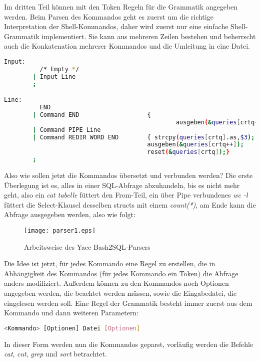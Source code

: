 Im dritten Teil können mit den Token Regeln für die Grammatik angegeben werden. Beim Parsen des Kommandos geht es zuerst um die richtige Interpretation der Shell-Kommandos, daher wird zuerst nur eine einfache Shell-Grammatik implementiert. Sie kann aus mehreren Zeilen bestehen und beherrscht auch die Konkatenation mehrerer Kommandos und die Umleitung in eine Datei.

\begin{lstlisting}[language=Bash]
Input:
          /* Empty */
        | Input Line
        ;

Line:
          END
        | Command END                   {
                                                ausgeben(&queries[crtq++]); reset(&queries[crtq]);}
        | Command PIPE Line            
        | Command REDIR WORD END        { strcpy(queries[crtq].as,$3);
                                        ausgeben(&queries[crtq++]);
                                        reset(&queries[crtq]);}
        ;
\end{lstlisting}

Also wie sollen jetzt die Kommandos übersetzt und verbunden werden? Die erste Überlegung ist es, alles in einer SQL-Abfrage abzuhandeln, bis es nicht mehr geht,
also ein \textit{cat tabelle} füttert den From-Teil, ein über Pipe verbundenes \textit{wc -l} füttert die Select-Klausel desselben structs mit einem \textit{count(*)}, am Ende kann die Abfrage ausgegeben werden, also wie folgt:

\begin{figure}[h]
\centering
\texttt{[image: parser1.eps]}
\caption{Arbeitsweise des Yacc Bash2SQL-Parsers}
\label{fig:parser1}
\end{figure}

Die Idee ist jetzt, für jedes Kommando eine Regel zu erstellen, die in Abhängigkeit des Kommandos (für jedes Kommando ein Token) die Abfrage anders modifiziert.
Außerdem können zu den Kommandos noch Optionen angegeben werden, die beachtet werden müssen, sowie die Eingabedatei, die eingelesen werden soll. Eine Regel der Grammatik besteht immer zuerst aus dem Kommando und dann weiteren Parametern:

\begin{lstlisting}[language=Bash]
<Kommando> [Optionen] Datei [Optionen]
\end{lstlisting}

In dieser Form werden nun die Kommandos geparst, vorläufig werden die Befehle \textit{cat}, \textit{cut}, \textit{grep} und \textit{sort} betrachtet.

